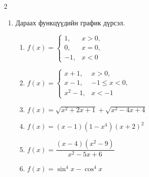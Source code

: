 \begin{multicols}{2}
\begin{enumerate}
\begin{enumerate}
  \item $y = \sin x, \quad x \in \left[\tfrac{\pi}{2}, \tfrac{3\pi}{2}\right].$
  \item $y = \cos x, \quad x \in [-\pi, 0].$
  \item $y = \cos x, \quad x \in [2\pi, 3\pi].$
\end{enumerate}
\item Дараах функцүүдийн график дүрсэл.
\begin{enumerate}
    \item $f(x) =
    \begin{cases}
      1, & x > 0, \\
     0, & x =0, \\
      -1, & x < 0
    \end{cases}$
     \item $f(x) =
    \begin{cases}
      x+1, & x > 0, \\
     x-1, & -1\leq x < 0, \\
      x^2-1, & x < -1
    \end{cases}$
    \item $f(x)=\sqrt{x^2+2x+1}+\sqrt{x^2-4x+4}$
    \item $f(x)=(x-1)(1-x^4)(x+2)^2$
    \item $f(x)=\dfrac{(x-4)(x^2-9)}{x^2-5x+6}$
    \item $f(x)=\sin^4x-\cos^4 x$
\end{enumerate}
\end{enumerate}
\end{multicols}
\newpage
